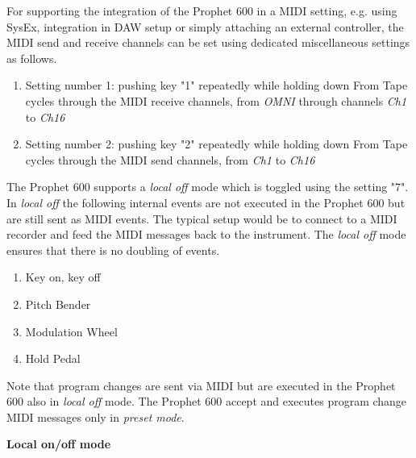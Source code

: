 For supporting the integration of the Prophet 600 in a MIDI setting, e.g. using SysEx, integration in DAW setup or simply attaching an external controller, the MIDI send and receive channels can be set using dedicated miscellaneous settings as follows.

\begin{enumerate}
  \setlength\itemsep{0cm}
  \item Setting number 1: pushing key "1" repeatedly while holding down From Tape cycles through the MIDI receive channels, from \textit{OMNI} through channels \textit{Ch1} to \textit{Ch16}
  \item Setting number 2: pushing key "2" repeatedly while holding down From Tape cycles through the MIDI send channels, from \textit{Ch1} to \textit{Ch16}
\end{enumerate}

The Prophet 600 supports a \textit{local off} mode which is toggled using the setting "7". In \textit{local off} the following internal events are not executed in the Prophet 600 but are still sent as MIDI events. The typical setup would be to connect to a MIDI recorder and feed the MIDI messages back to the instrument. The \textit{local off} mode ensures that there is no doubling of events.

\begin{enumerate}
  \setlength\itemsep{0cm}
  \item Key on, key off
  \item Pitch Bender
  \item Modulation Wheel
  \item Hold Pedal
\end{enumerate}

Note that program changes are sent via MIDI but are executed in the Prophet 600 also in \textit{local off} mode. The Prophet 600 accept and executes program change MIDI messages only in \textit{preset mode}.  

\textbf{Local on/off mode}
